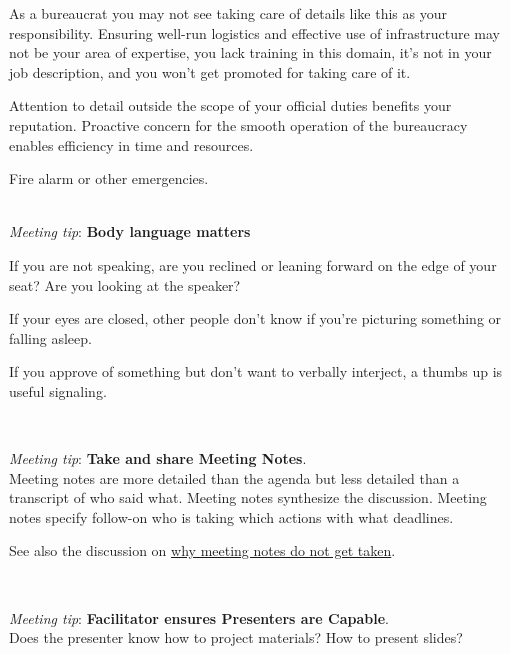 As a bureaucrat you may not see taking care of details like this as your responsibility. Ensuring well-run logistics and effective use of infrastructure may not be your area of expertise, you lack training in this domain, it's not in your job description, and you won't get promoted for taking care of it. 

Attention to detail outside the scope of your official duties benefits your reputation. Proactive concern for the smooth operation of the bureaucracy enables efficiency in time and resources.


Fire alarm or other emergencies. 

\ \\
\textit{Meeting tip}: \textbf{Body language matters}

If you are not speaking, are you reclined or leaning forward on the edge of your seat? Are you looking at the speaker?

If your eyes are closed, other people don't know if you're picturing something or falling asleep. 

If you approve of something but don't want to verbally interject, a thumbs up is useful signaling. 

\ \\
\begin{samepage}
\textit{Meeting tip}: \textbf{Take and share Meeting Notes}.\\
Meeting notes are more detailed than the agenda but less detailed than a transcript of who said what. Meeting notes synthesize the discussion. Meeting notes specify follow-on who is taking which actions with what deadlines. 
\end{samepage}

See also the discussion on \hyperref[sec:written-comm-does-not-happen]{why meeting notes do not get taken}.

\ \\
\begin{samepage}
\textit{Meeting tip}: \textbf{Facilitator ensures Presenters are Capable}.\\
Does the presenter know how to project materials? How to present slides?
\end{samepage}

